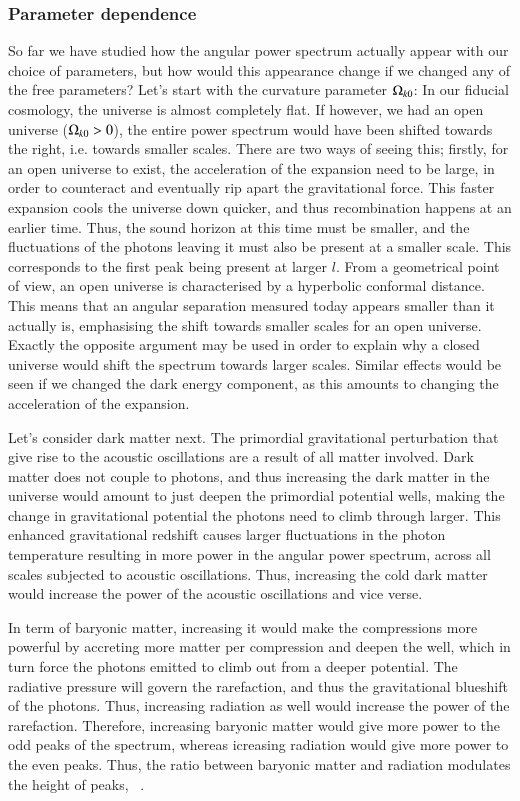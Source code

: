     \subsubsection{Parameter dependence}
        So far we have studied how the angular power spectrum actually appear with our choice of parameters, but how would this appearance change if we changed any of the free parameters? Let's start with the curvature parameter $\Omega_{k0}$: In our fiducial cosmology, the universe is almost completely flat. If however, we had an open universe ($\Omega_{k0}>0$), the entire power spectrum would have been shifted towards the right, i.e. towards smaller scales. There are two ways of seeing this; firstly, for an open universe to exist, the acceleration of the expansion need to be large, in order to counteract and eventually rip apart the gravitational force. This faster expansion cools the universe down quicker, and thus recombination happens at an earlier time. Thus, the sound horizon at this time must be smaller, and the fluctuations of the photons leaving it must also be present at a smaller scale. This corresponds to the first peak being present at larger $l$. From a geometrical point of view, an open universe is characterised by a hyperbolic conformal distance. This means that an angular separation measured today appears smaller than it actually is, emphasising the shift towards smaller scales for an open universe. Exactly the opposite argument may be used in order to explain why a closed universe would shift the spectrum towards larger scales. Similar effects would be seen if we changed the dark energy component, as this amounts to changing the acceleration of the expansion. 

        Let's consider dark matter next. The primordial gravitational perturbation that give rise to the acoustic oscillations are a result of all matter involved. Dark matter does not couple to photons, and thus increasing the dark matter in the universe would amount to just deepen the primordial potential wells, making the change in gravitational potential the photons need to climb through larger. This enhanced gravitational redshift causes larger fluctuations in the photon temperature resulting in more power in the angular power spectrum, across all scales subjected to acoustic oscillations. Thus, increasing the cold dark matter would increase the power of the acoustic oscillations and vice verse. 

        In term of baryonic matter, increasing it would make the compressions more powerful by accreting more matter per compression and deepen the well, which in turn force the photons emitted to climb out from a deeper potential. The radiative pressure will govern the rarefaction, and thus the gravitational blueshift of the photons. Thus, increasing radiation as well would increase the power of the rarefaction. Therefore, increasing baryonic matter would give more power to the odd peaks of the spectrum, whereas icreasing radiation would give more power to the even peaks. Thus, the ratio between baryonic matter and radiation modulates the height of peaks, ~\cite{Hu_1996}.

